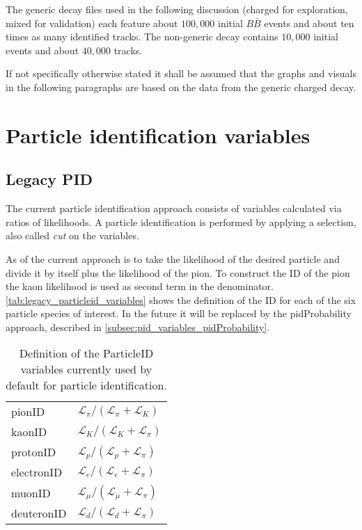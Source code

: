 The generic decay files used in the following discussion (charged for exploration, mixed for validation) each feature about $100,000$ initial $B \bar{B}$ events and about ten times as many identified tracks. The non-generic decay contains $10,000$ initial events and about $40,000$ tracks.

If not specifically otherwise stated it shall be assumed that the graphs and visuals in the following paragraphs are based on the data from the generic charged decay.

\section{Particle identification variables}
\label{sec:pid_variables}

\subsection{Legacy PID}
\label{subsec:pid_variables_legacy_pid}

The current particle identification approach consists of variables calculated via ratios of likelihoods. A particle identification is performed by applying a selection, also called \textit{cut} on the variables.

As of  the current approach is to take the likelihood of the desired particle and divide it by itself plus the likelihood of the pion. To construct the ID of the pion the kaon likelihood is used as second term in the denominator. \autoref{tab:legacy_particleid_variables} shows the definition of the ID for each of the six particle species of interest. In the future it will be replaced by the pidProbability approach, described in \autoref{subsec:pid_variables_pidProbability}.

\begin{table}[ht]
	\centering
	\begin{tabular}{l|l}
		pionID & $\mathcal{L}_{\pi} / (\mathcal{L}_{\pi} + \mathcal{L}_{K})$ \\
		kaonID & $\mathcal{L}_{K} / (\mathcal{L}_{K} +\mathcal{L}_{\pi})$ \\
		protonID & $\mathcal{L}_{p} / (\mathcal{L}_{p} +\mathcal{L}_{\pi})$ \\
		electronID & $\mathcal{L}_{e} / (\mathcal{L}_{e} +\mathcal{L}_{\pi})$ \\
		muonID & $\mathcal{L}_{\mu} / (\mathcal{L}_{\mu} +\mathcal{L}_{\pi})$ \\
		deuteronID & $\mathcal{L}_{d} / (\mathcal{L}_{d} +\mathcal{L}_{\pi})$
	\end{tabular}
	\caption{Definition of the ParticleID variables currently used by default for particle identification.}
	\label{tab:legacy_particleid_variables}
\end{table}


